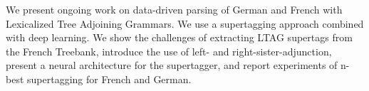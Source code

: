 We present ongoing work on data-driven parsing of German and French with Lexicalized Tree Adjoining Grammars. We use a supertagging approach combined with deep learning. We show the challenges of extracting LTAG supertags from the French Treebank, introduce the use of left- and right-sister-adjunction, present a neural architecture for the supertagger, and report experiments of n-best supertagging for French and German.
